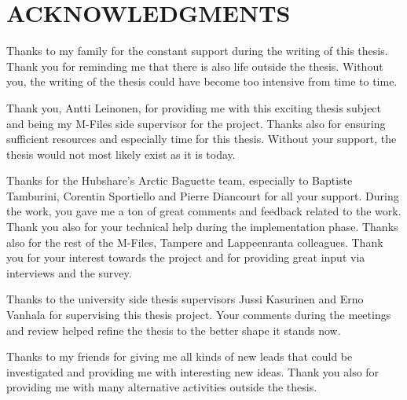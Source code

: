 \chapter*{ACKNOWLEDGMENTS}
Thanks to my family for the constant support during the writing of this thesis. Thank you for reminding me that there is also life outside the thesis. Without you, the writing of the thesis could have become too intensive from time to time.

Thank you, Antti Leinonen, for providing me with this exciting thesis subject and being my M-Files side supervisor for the project. Thanks also for ensuring sufficient resources and especially time for this thesis. Without your support, the thesis would not most likely exist as it is today.

Thanks for the Hubshare's Arctic Baguette team, especially to Baptiste Tamburini, Corentin Sportiello and Pierre Diancourt for all your support. During the work, you gave me a ton of great comments and feedback related to the work. Thank you also for your technical help during the implementation phase. Thanks also for the rest of the M-Files, Tampere and Lappeenranta colleagues. Thank you for your interest towards the project and for providing great input via interviews and the survey.

Thanks to the university side thesis supervisors Jussi Kasurinen and Erno Vanhala for supervising this thesis project. Your comments during the meetings and review helped refine the thesis to the better shape it stands now.

Thanks to my friends for giving me all kinds of new leads that could be investigated and providing me with interesting new ideas. Thank you also for providing me with many alternative activities outside the thesis.